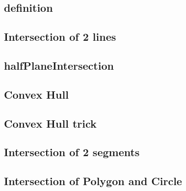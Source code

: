 \documentclass[a4paper,10pt,twocolumn,oneside]{article}
\begin{document}
\subsection{definition}


\subsection{Intersection of 2 lines}


% 
\subsection{halfPlaneIntersection}


\subsection{Convex Hull}


\subsection{Convex Hull trick}


%

\subsection{Intersection of 2 segments}


\subsection{Intersection of Polygon and Circle}


%
\end{document}
